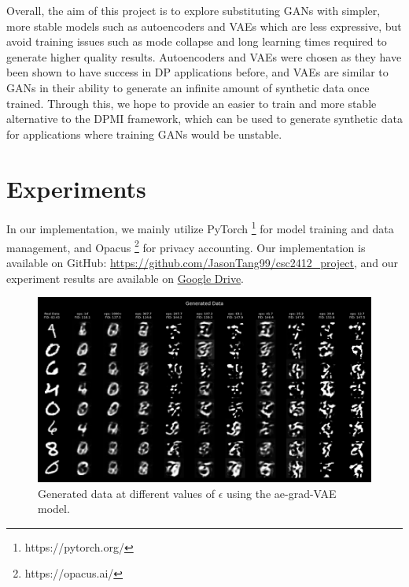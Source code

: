 \documentclass{article}
\begin{document}
Overall, the aim of this project is to explore substituting GANs with simpler, more stable models such as autoencoders and VAEs which are less expressive, but avoid training issues such as mode collapse and long learning times required to generate higher quality results. Autoencoders and VAEs were chosen as they have been shown to have success in DP applications \cite{dp_gen} before, and VAEs are similar to GANs in their ability to generate an infinite amount of synthetic data once trained. Through this, we hope to provide an easier to train and more stable alternative to the DPMI framework, which can be used to generate synthetic data for applications where training GANs would be unstable.



\section{Experiments}
In our implementation, we mainly utilize PyTorch \footnote{https://pytorch.org/} for model training and data management, and Opacus \footnote{https://opacus.ai/} \cite{opacus} for privacy accounting. Our implementation is available on GitHub: \url{https://github.com/JasonTang99/csc2412_project}, and our experiment results are available on \href{https://drive.google.com/file/d/1nR0wDjarNUtH99o7XbLVs1exvMhBTxh9/view?usp=share_link}{Google Drive}.

\begin{figure}[!h]
    \centering
    \includegraphics[width=\columnwidth]{images/generated_data.png}
    \caption{Generated data at different values of $\epsilon$ using the ae-grad-VAE model.}
    \label{fig:generated_data}
\end{figure}
\end{document}
